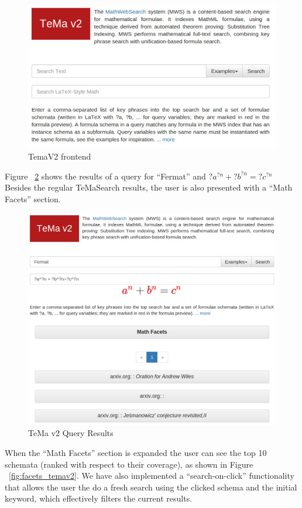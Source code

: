 \documentclass{deliverablereport}
\begin{document}
\begin{figure}[H]
\centering
 \includegraphics[scale=0.8]{figure8.jpg}
 \caption{TemaV2 frontend}
 \label{fig:temav2}
\end{figure}

Figure ~\ref{fig:temav2query} shows the results of a query for “Fermat” and $?a^{?n}+?b^{?n}=?c^{?n}$ Besides the regular TeMaSearch results, the user is also presented with a “Math Facets” section.

\begin{figure}[H]
\centering
 \includegraphics[scale=0.6]{figure9.jpg}
 \caption{TeMa v2 Query Results}
 \label{fig:temav2query}
\end{figure}

When the “Math Facets” section is expanded the user can see the top 10 schemata (ranked with respect to their coverage), as shown in Figure ~\ref{fig:facets_temav2}. We have also implemented a “search-on-click” functionality that allows the user the do a fresh search using the clicked schema and the initial keyword, which effectively filters the current results.
\end{document}
